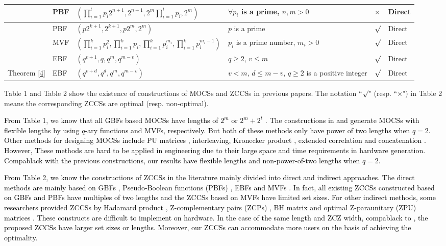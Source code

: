 \documentclass[11pt]{article}
\newcommand{\2} {$2$-to-$1$}
\begin{document}
\begin{table}
\begin{tabular}{|m{0.8cm}<{\centering}|m{1.5cm}<{\centering}|m{6cm}<{\centering}|m{3cm}<{\centering}|m{0.8cm}<{\centering}|m{1cm}<{\centering}|}
		\hline \cite{GG}&PBF&$(\prod^{l}_{i=1}p_{i}2^{n+1},2^{n+1},2^{m}\prod^{l}_{i=1}p_{i},2^{m})$&$\forall p_{i}$ is a prime, $n,m>0$ &$\times$& Direct\\
		\hline \cite{SP4}&PBF&$(p2^{k+1},2^{k+1},p2^{m},2^{m})$&$p$ is a prime&$\surd$& Direct\\	

	   
		\hline \cite{RA}&MVF& $(\prod^{k}_{i=1}p_{i}^2,\prod^{k}_{i=1}p_{i},\prod^{k}_{i=1}p_{i}^{m_{i}},\prod^{k}_{i=1}p_{i}^{m_{i}-1})$&$p_i$ is a prime number, $m_i>0$&$\surd$& Direct\\
		\hline \cite{SB}&EBF&$(q^{v+1},q,q^{m},q^{m-v})$&$q\geq 2$, $v\leq m$&$\surd$& Direct\\
		\hline Theorem \ref{4}&EBF&$(q^{v+d},q^d,q^{m},q^{m-v})$&$v< m$, $d\leq m-v$, $q\geq 2$ is a  positive integer&$\surd$& Direct\\
		\hline
	\end{tabular}
\end{table}
Table 1 and Table 2 show the existence of constructions of MOCSs and ZCCSs in previous papers. The notation ``$\surd$" (resp. ``$\times$") in Table 2 means the corresponding ZCCSs are optimal (resp. non-optimal).

\textcolor{black}{
From Table 1, we know that all GBFs based MOCSs  have lengths of $2^m$ or $2^{m}+2^{t}$ \cite{ AR,  SW, LT,KM}. The constructions in \cite{SP5} and \cite{PS2} generate MOCSs with flexible lengths by using $q$-ary functions and MVFs, respectively. But  both of these methods only have power of two lengths when $q=2.$ Other methods for designing  MOCSs include  PU matrices \cite{SD1,SD2}, interleaving, Kronecker product \cite{ZG,YJ}, extended correlation \cite{KL} and concatenation \cite{SB}. However, These  methods are hard to be applied in engineering due to their large space and time requirements in hardware generation. Compablack with the previous constructions, our results have flexible lengths and  non-power-of-two lengths when $q=2$.
}

\textcolor{black}{
From Table 2, we know the constructions of ZCCSs in the literature mainly divided into direct and indirect approaches. The direct methods are mainly based on GBFs \cite{SP3,SP2,SP1,WS,XC, GG1}, Pseudo-Boolean functions (PBFs) \cite{GG,SP4}, EBFs \cite{SB} and MVFs \cite{RA}. In fact, all existing ZCCSs constructed based on GBFs and PBFs have multiples of two lengths and the ZCCSs based on MVFs have limited set sizes.  For other indirect methods, some researchers provided ZCCSs by Hadamard product \cite{AA}, Z-complementary pairs (ZCPs) \cite{AA},  BH matrix  and optimal Z-paraunitary (ZPU) matrices \cite{DS}. These constructs are difficult to implement on hardware.  In the case of the same length and ZCZ width, compablack to \cite{SB}, the proposed  ZCCSs have larger set sizes or lengths. Moreover, our ZCCSs can accommodate more users on the basis of achieving the optimality.}
\end{document}
